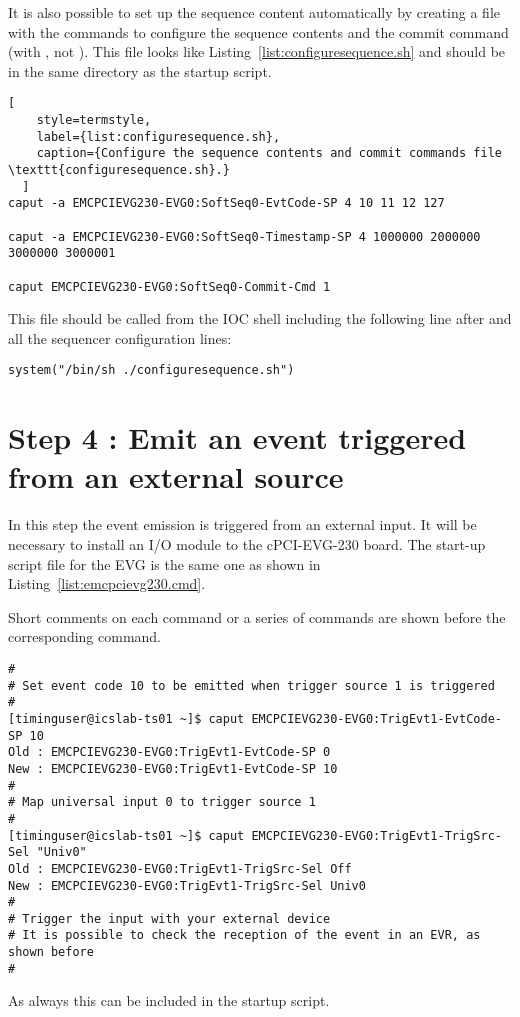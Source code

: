 \documentclass[11pt
  , a4paper
  , article
  , oneside
  , showtrims
]{memoir}
\begin{document}
It is also possible to set up the sequence content automatically by creating a file with the commands to configure the sequence contents and the commit command (with , not ). This file looks like Listing~\ref{list:configuresequence.sh} and should be in the same directory as the startup script.
\begin{lstlisting}[
    style=termstyle,
    label={list:configuresequence.sh},
    caption={Configure the sequence contents and commit commands file \texttt{configuresequence.sh}.}
  ]
caput -a EMCPCIEVG230-EVG0:SoftSeq0-EvtCode-SP 4 10 11 12 127

caput -a EMCPCIEVG230-EVG0:SoftSeq0-Timestamp-SP 4 1000000 2000000 3000000 3000001

caput EMCPCIEVG230-EVG0:SoftSeq0-Commit-Cmd 1
\end{lstlisting}

This file should be called from the IOC shell including the following line after  and all the sequencer configuration lines:
\begin{lstlisting}
system("/bin/sh ./configuresequence.sh")
\end{lstlisting}


\section{Step 4 : Emit an event triggered from an external source}
In this step the event emission is triggered from an external input. It will be necessary to install an I/O module to the cPCI-EVG-230 board. The start-up script file for the EVG is the same one as shown in Listing~\ref{list:emcpcievg230.cmd}.

Short comments on each command or a series of commands are shown before the corresponding command.

\begin{lstlisting}[style=termstyle]
#
# Set event code 10 to be emitted when trigger source 1 is triggered
#
[timinguser@icslab-ts01 ~]$ caput EMCPCIEVG230-EVG0:TrigEvt1-EvtCode-SP 10
Old : EMCPCIEVG230-EVG0:TrigEvt1-EvtCode-SP 0
New : EMCPCIEVG230-EVG0:TrigEvt1-EvtCode-SP 10
#
# Map universal input 0 to trigger source 1
#
[timinguser@icslab-ts01 ~]$ caput EMCPCIEVG230-EVG0:TrigEvt1-TrigSrc-Sel "Univ0"
Old : EMCPCIEVG230-EVG0:TrigEvt1-TrigSrc-Sel Off
New : EMCPCIEVG230-EVG0:TrigEvt1-TrigSrc-Sel Univ0
#
# Trigger the input with your external device
# It is possible to check the reception of the event in an EVR, as shown before
#
\end{lstlisting}
As always this can be included in the startup script.
\end{document}
